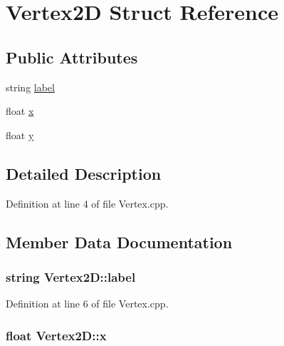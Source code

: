 \hypertarget{struct_vertex2_d}{}\section{Vertex2D Struct Reference}
\label{struct_vertex2_d}
\subsection*{Public Attributes}
\begin{DoxyCompactItemize}
\item 
string \hyperlink{struct_vertex2_d_a549a8dbf41453045e1ffe05f0fd5e288}{label}
\item 
float \hyperlink{struct_vertex2_d_a39275a5945c972e573be08b52031a7d4}{x}
\item 
float \hyperlink{struct_vertex2_d_ac3948cfb8740e52bfa30daaf17cc5043}{y}
\end{DoxyCompactItemize}


\subsection{Detailed Description}


Definition at line 4 of file Vertex.\+cpp.



\subsection{Member Data Documentation}
\subsubsection[{\texorpdfstring{label}{label}}]{\setlength{\rightskip}{0pt plus 5cm}string Vertex2\+D\+::label}\hypertarget{struct_vertex2_d_a549a8dbf41453045e1ffe05f0fd5e288}{}\label{struct_vertex2_d_a549a8dbf41453045e1ffe05f0fd5e288}


Definition at line 6 of file Vertex.\+cpp.

\subsubsection[{\texorpdfstring{x}{x}}]{\setlength{\rightskip}{0pt plus 5cm}float Vertex2\+D\+::x}\hypertarget{struct_vertex2_d_a39275a5945c972e573be08b52031a7d4}{}\label{struct_vertex2_d_a39275a5945c972e573be08b52031a7d4}


